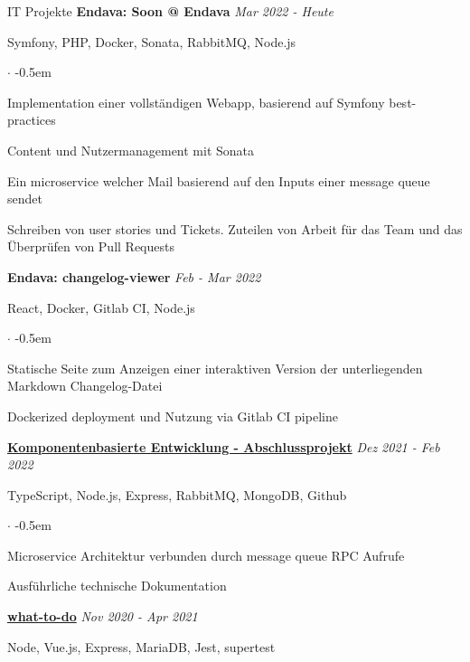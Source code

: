 \documentclass{cv}
\begin{document}
\begin{rSection}{IT Projekte}
  \textbf{Endava: Soon @ Endava}
  \hfill
  {\em Mar 2022 - Heute}

  Symfony, PHP, Docker, Sonata, RabbitMQ, Node.js
  \begin{list}{$\cdot$}{}
    \itemsep -0.5em \vspace{-0.5em}
    \smallskip
    \item Implementation einer vollständigen Webapp, basierend auf Symfony best-practices
    \item Content und Nutzermanagement mit Sonata
    \item Ein microservice welcher Mail basierend auf den Inputs einer message queue sendet
    \item Schreiben von user stories und Tickets. Zuteilen von Arbeit für das Team und das Überprüfen von Pull Requests
  \end{list}

  \textbf{Endava: changelog-viewer}
  \hfill
  {\em Feb - Mar 2022}

  React, Docker, Gitlab CI, Node.js
  \begin{list}{$\cdot$}{}
    \itemsep -0.5em \vspace{-0.5em}
    \smallskip
    \item Statische Seite zum Anzeigen einer interaktiven Version der unterliegenden Markdown Changelog-Datei
    \item Dockerized deployment und Nutzung via Gitlab CI pipeline
  \end{list}

  \break

  \textbf{\href{https://github.com/htw-kbe-jneidel/main}{Komponentenbasierte Entwicklung - Abschlussprojekt}}
  \hfill
  {\em Dez 2021 - Feb 2022}

  TypeScript, Node.js, Express, RabbitMQ, MongoDB, Github
  \begin{list}{$\cdot$}{}
    \itemsep -0.5em \vspace{-0.5em}
    \smallskip
    \item Microservice Architektur verbunden durch message queue RPC Aufrufe
    \item Ausführliche technische Dokumentation
  \end{list}

  \textbf{\href{https://github.com/jneidel/what-to-do}{what-to-do}}
  \hfill
  {\em Nov 2020 - Apr 2021}

  Node, Vue.js, Express, MariaDB, Jest, supertest


\end{rSection}
\end{document}
